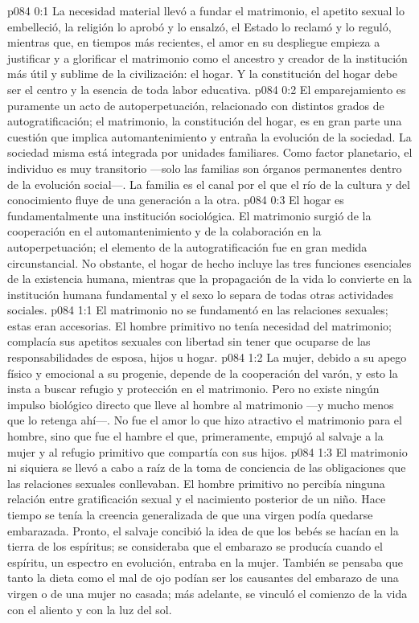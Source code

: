 \author{Jefe de los serafines}
\vs p084 0:1 La necesidad material llevó a fundar el matrimonio, el apetito sexual lo embelleció, la religión lo aprobó y lo ensalzó, el Estado lo reclamó y lo reguló, mientras que, en tiempos más recientes, el amor en su despliegue empieza a justificar y a glorificar el matrimonio como el ancestro y creador de la institución más útil y sublime de la civilización: el hogar. Y la constitución del hogar debe ser el centro y la esencia de toda labor educativa.
\vs p084 0:2 El emparejamiento es puramente un acto de autoperpetuación, relacionado con distintos grados de autogratificación; el matrimonio, la constitución del hogar, es en gran parte una cuestión que implica automantenimiento y entraña la evolución de la sociedad. La sociedad misma está integrada por unidades familiares. Como factor planetario, el individuo es muy transitorio ---solo las familias son órganos permanentes dentro de la evolución social---. La familia es el canal por el que el río de la cultura y del conocimiento fluye de una generación a la otra.
\vs p084 0:3 El hogar es fundamentalmente una institución sociológica. El matrimonio surgió de la cooperación en el automantenimiento y de la colaboración en la autoperpetuación; el elemento de la autogratificación fue en gran medida circunstancial. No obstante, el hogar de hecho incluye las tres funciones esenciales de la existencia humana, mientras que la propagación de la vida lo convierte en la institución humana fundamental y el sexo lo separa de todas otras actividades sociales.
\vs p084 1:1 El matrimonio no se fundamentó en las relaciones sexuales; estas eran accesorias. El hombre primitivo no tenía necesidad del matrimonio; complacía sus apetitos sexuales con libertad sin tener que ocuparse de las responsabilidades de esposa, hijos u hogar.
\vs p084 1:2 La mujer, debido a su apego físico y emocional a su progenie, depende de la cooperación del varón, y esto la insta a buscar refugio y protección en el matrimonio. Pero no existe ningún impulso biológico directo que lleve al hombre al matrimonio ---y mucho menos que lo retenga ahí---. No fue el amor lo que hizo atractivo el matrimonio para el hombre, sino que fue el hambre el que, primeramente, empujó al salvaje a la mujer y al refugio primitivo que compartía con sus hijos.
\vs p084 1:3 \pc El matrimonio ni siquiera se llevó a cabo a raíz de la toma de conciencia de las obligaciones que las relaciones sexuales conllevaban. El hombre primitivo no percibía ninguna relación entre gratificación sexual y el nacimiento posterior de un niño. Hace tiempo se tenía la creencia generalizada de que una virgen podía quedarse embarazada. Pronto, el salvaje concibió la idea de que los bebés se hacían en la tierra de los espíritus; se consideraba que el embarazo se producía cuando el espíritu, un espectro en evolución, entraba en la mujer. También se pensaba que tanto la dieta como el mal de ojo podían ser los causantes del embarazo de una virgen o de una mujer no casada; más adelante, se vinculó el comienzo de la vida con el aliento y con la luz del sol.
